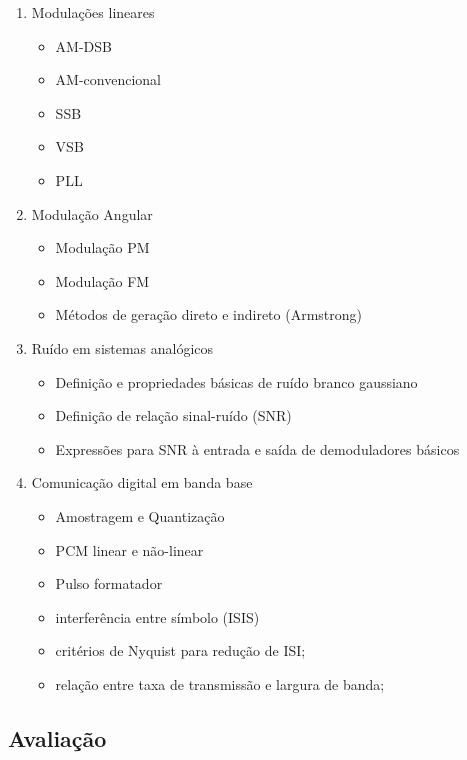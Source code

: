   \begin{enumerate}
      \item Modulações lineares
      \begin{itemize}
          \item AM-DSB
          \item AM-convencional
          \item SSB
          \item VSB
          \item PLL
      \end{itemize}
      \item Modulação Angular
        \begin{itemize}
          \item Modulação PM
          \item Modulação FM
          \item Métodos de geração direto e indireto (Armstrong)
      \end{itemize}
      \item Ruído em sistemas analógicos 
      \begin{itemize}
          \item Definição e propriedades básicas de ruído branco gaussiano
          \item Definição de relação sinal-ruído (SNR)
          \item Expressões para SNR à entrada e saída de demoduladores básicos
      \end{itemize}
      \item Comunicação digital em banda base 
      \begin{itemize}
          \item Amostragem e Quantização
          \item PCM linear e não-linear
          \item Pulso formatador
          \item interferência entre símbolo (ISIS)
          \item critérios de Nyquist para redução de ISI; \item relação entre taxa de transmissão e largura de banda;
      \end{itemize}
  \end{enumerate}
  
  \begin{snugshade}
  \section{Avaliação}
  \end{snugshade}
  

